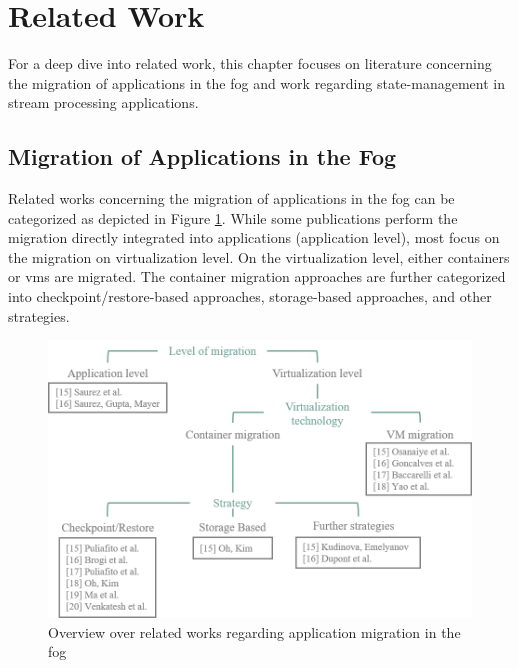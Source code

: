 \section{Related Work}
\label{lRelatedWork}
For a deep dive into related work, this chapter focuses on literature concerning the migration of applications in the fog and work regarding state-management in stream processing applications.

\subsection{Migration of Applications in the Fog}
\label{lMigrationInTheFog}
Related works concerning the migration of applications in the fog can be categorized as depicted in Figure \ref{fOverviewLiteratureFog}. While some publications perform the migration directly integrated into applications (application level), most focus on the migration on virtualization level. On the virtualization level, either containers or \gls{vm}s are migrated. The container migration approaches are further categorized into checkpoint/restore-based approaches, storage-based approaches, and other strategies.

\begin{figure}[H]
\graphicspath{{./figures/code/}}
\includegraphics[width=\textwidth]{figures/visualizations/RelatedWorkFogOverview_1500.png}
\caption{Overview over related works regarding application migration in the fog}
\label{fOverviewLiteratureFog}
\end{figure}


